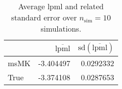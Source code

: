 \begin{table}[H]

\caption{Average lpml and related standard error over $n_{\text{sim}} = 10$ simulations.}
\centering
\begin{tabular}[t]{lrr}
\toprule
  & $\overbar{\text{lpml}}$ & $\text{sd}(\overbar{\text{lpml}})$\\
\midrule
msMK & -3.404497 & 0.0292332\\
True & -3.374108 & 0.0287653\\
\bottomrule
\end{tabular}
\end{table}